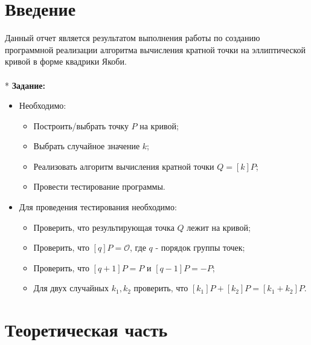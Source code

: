 \documentclass[12pt]{article}
\begin{document}
\newpage
{
\hypersetup{linkcolor=black}
\tableofcontents
}
\newpage


\section{Введение}
Данный отчет является результатом выполнения работы по созданию программной реализации алгоритма вычисления кратной точки на эллиптической кривой в форме квадрики Якоби. \\
\\*
\textbf{Задание:}
\begin{itemize}
\item Необходимо:
	\begin{itemize}
	\item Построить/выбрать точку $P$ на кривой;
	\item Выбрать случайное значение $k$;
	\item Реализовать алгоритм вычисления кратной точки $Q = [k]P$;
	\item Провести тестирование программы.
	\end{itemize}
\item Для проведения тестирования необходимо:
	\begin{itemize}
	\item Проверить, что результирующая точка $Q$ лежит на кривой;
	\item Проверить, что $[q]P = \mathcal{O}$, где $q$ - порядок группы точек;
	\item Проверить, что $[q + 1]P = P$ и $[q - 1]P = - P$;
	\item Для двух случайных $k_1, k_2$ проверить, что $[k_1]P + [k_2]P = [k_1 + k_2]P$.
	\end{itemize}
\end{itemize}
\newpage


\section{Теоретическая часть}
\end{document}
